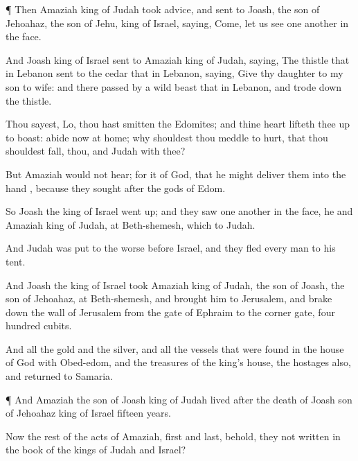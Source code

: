 {\par }{\PP {}¶ Then
Amaziah
king of
Judah took
advice, and
sent to
Joash, the
son of
Jehoahaz, the
son of
Jehu,
king of
Israel,
saying,
Come, let us see one
another in the
face.

And
Joash
king of
Israel
sent to
Amaziah
king of
Judah,
saying, The
thistle that
{} in
Lebanon
sent to the
cedar that
{} in
Lebanon,
saying,
Give thy
daughter to my
son to
wife: and there passed
by a
wild
beast that
{} in
Lebanon, and trode
down the
thistle.

Thou
sayest, Lo, thou hast
smitten the
Edomites; and thine
heart lifteth thee
up to
boast:
abide now at
home; why shouldest thou
meddle to
{}
hurt, that thou shouldest
fall,
{} thou, and
Judah with thee?

But
Amaziah would not
hear; for it
{} of
God, that he might
deliver them into the
hand
{}, because they
sought after the
gods of
Edom.

So
Joash the
king of
Israel went
up; and they saw one
another in the
face,
{} he and
Amaziah
king of
Judah, at
Beth-shemesh, which
{} to
Judah.

And
Judah was put to the
worse
before
Israel, and they
fled every
man to his
tent.

And
Joash the
king of
Israel
took
Amaziah
king of
Judah, the
son of
Joash, the
son of
Jehoahaz, at
Beth-shemesh, and
brought him to
Jerusalem, and brake
down the
wall of
Jerusalem from the
gate of
Ephraim to the
corner
gate,
four
hundred
cubits.

And
{} all the
gold and the
silver, and all the
vessels that were
found in the
house of
God with
Obed-edom, and the
treasures of the
king’s
house, the
hostages also, and
returned to
Samaria.


\par }{\PP {}¶ And
Amaziah the
son of
Joash
king of
Judah
lived
after the
death of
Joash
son of
Jehoahaz
king of
Israel
fifteen
years.

Now the
rest of the
acts of
Amaziah,
first and
last, behold,
{} they not
written in the
book of the
kings of
Judah and
Israel?


}
